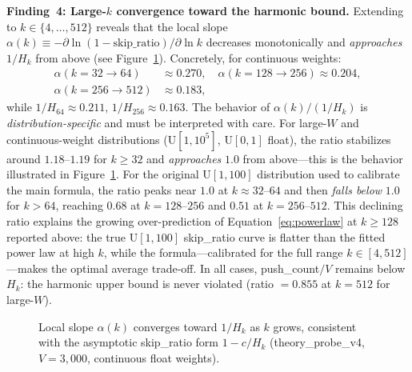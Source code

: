 \documentclass[conference]{IEEEtran}
\begin{document}
\noindent\textbf{Finding~4: Large-$k$ convergence toward the harmonic bound.}
Extending to $k\in\{4,\ldots,512\}$ reveals that the local slope
$\alpha(k) \equiv -\partial\ln(1-\text{skip\_ratio})/\partial\ln k$
decreases monotonically and \emph{approaches} $1/H_k$ from above
(see Figure~\ref{fig:local_alpha}).
Concretely, for continuous weights:
\begin{align*}
\alpha(k\!=\!32{\to}64)   &\approx 0.270, \quad
\alpha(k\!=\!128{\to}256)  \approx 0.204, \\
\alpha(k\!=\!256{\to}512) &\approx 0.183,
\end{align*}
while $1/H_{64}\approx 0.211$, $1/H_{256}\approx 0.163$.
The behavior of $\alpha(k)/(1/H_k)$ is \emph{distribution-specific}
and must be interpreted with care.
For large-$W$ and continuous-weight distributions ($\mathrm{U}[1,10^5]$,
$\mathrm{U}[0,1]$ float), the ratio stabilizes around $1.18$--$1.19$
for $k\geq 32$ and \emph{approaches} $1.0$ from above---this is the
behavior illustrated in Figure~\ref{fig:local_alpha}.
For the original $\mathrm{U}[1,100]$ distribution used to calibrate the
main formula, the ratio peaks near $1.0$ at $k\approx 32$--$64$ and
then \emph{falls below} $1.0$ for $k>64$, reaching $0.68$ at
$k=128$--$256$ and $0.51$ at $k=256$--$512$.
This declining ratio explains the growing over-prediction of
Equation~\eqref{eq:powerlaw} at $k\geq 128$ reported above: the true
$\mathrm{U}[1,100]$ skip\_ratio curve is flatter than the fitted
power law at high $k$, while the formula—calibrated for the full range
$k\in[4,512]$—makes the optimal average trade-off.
In all cases, push\_count$/V$ remains below $H_k$: the harmonic upper
bound is never violated (ratio $=0.855$ at $k=512$ for large-$W$).

\begin{figure}[h]
\centering
{}
\caption{Local slope $\alpha(k)$ converges toward $1/H_k$ as $k$ grows,
consistent with the asymptotic skip\_ratio form $1-c/H_k$
(theory\_probe\_v4, $V=3{,}000$, continuous float weights).}
\label{fig:local_alpha}
\end{figure}
\end{document}
